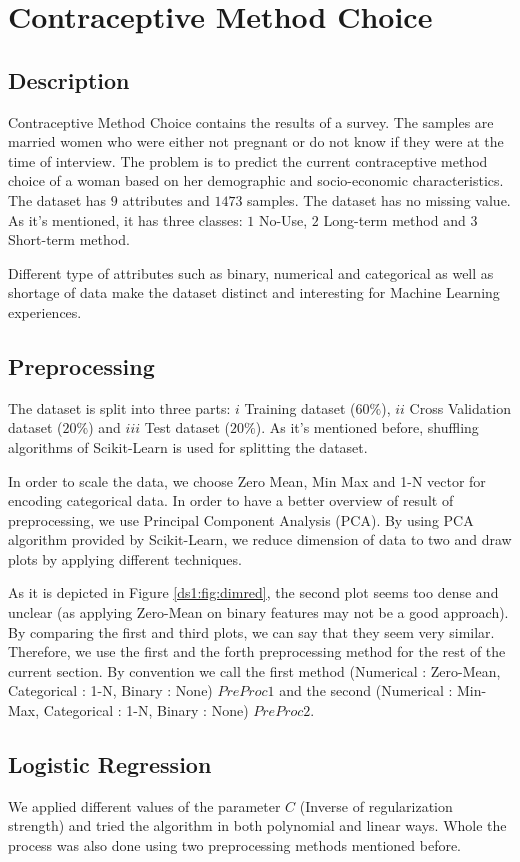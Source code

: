 \section{Contraceptive Method Choice}
\label{db:sec:ds1}
\subsection{Description}
Contraceptive Method Choice contains the results of a survey. The samples are married women who were either not pregnant or do not know if they were at the time of interview. The problem is to predict the current contraceptive method choice of a woman based on her demographic and socio-economic characteristics. The dataset has $9$ attributes and $1473$ samples. The dataset has no missing value. As it's mentioned, it has three classes: $1$ No-Use, $2$ Long-term method and $3$ Short-term method.

Different type of attributes such as binary, numerical and categorical as well as shortage of data make the dataset distinct and interesting for Machine Learning experiences.

\subsection{Preprocessing}
The dataset is split into three parts: $i$ Training dataset ($60\%$), $ii$ Cross Validation dataset ($20\%$) and $iii$ Test dataset ($20\%$). As it's mentioned before, shuffling algorithms of Scikit-Learn is used for splitting the dataset.

In order to scale the data, we choose Zero Mean, Min Max and 1-N vector for encoding categorical data. In order to have a better overview of result of preprocessing, we use Principal Component Analysis (PCA). By using PCA algorithm provided by Scikit-Learn, we reduce dimension of data to two and draw plots by applying different techniques. 

As it is depicted in Figure \ref{ds1:fig:dimred}, the second plot seems too dense and unclear (as applying Zero-Mean on binary features may not be a good approach). By comparing the first and third plots, we can say that they seem very similar. Therefore, we use the first and the forth preprocessing method for the rest of the current section. By convention we call the first method (Numerical : Zero-Mean, Categorical : 1-N, Binary : None) $PreProc1$ and the second (Numerical : Min-Max, Categorical : 1-N, Binary : None) $PreProc2$.


\subsection{Logistic Regression}
We applied different values of the parameter $C$ (Inverse of regularization strength) and tried the algorithm in both polynomial and linear ways. Whole the process was also done using two preprocessing methods mentioned before.

